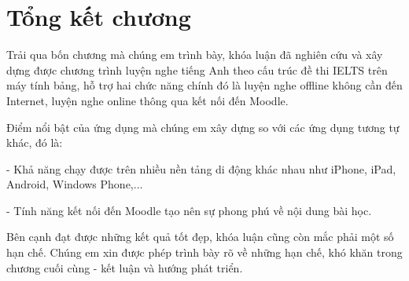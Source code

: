 \newpage

\section{Tổng kết chương}

Trải qua bốn chương mà chúng em trình bày, khóa luận đã nghiên cứu và xây dựng được chương trình luyện nghe tiếng Anh theo cấu trúc đề thi IELTS trên máy tính bảng, hỗ trợ hai chức năng chính đó là luyện nghe offline không cần đến Internet, luyện nghe online thông qua kết nối đến Moodle.

Điểm nổi bật của ứng dụng mà chúng em xây dựng so với các ứng dụng tương tự khác, đó là:

\quad - Khả năng chạy được trên nhiều nền tảng di động khác nhau như iPhone, iPad, Android, Windows Phone,...

\quad - Tính năng kết nối đến Moodle tạo nên sự phong phú về nội dung bài học.

Bên cạnh đạt được những kết quả tốt đẹp, khóa luận cũng còn mắc phải một số hạn chế. Chúng em xin được phép trình bày rõ về những hạn chế, khó khăn trong chương cuối cùng - kết luận và hướng phát triển.